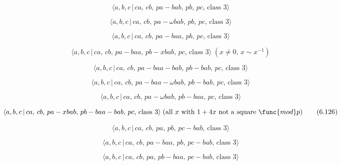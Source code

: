 \documentclass[10pt]{article}
\begin{document}
\begin{equation}
\langle a,b,c\,|\,ca,\,cb,\,pa-bab,\,pb,\,pc,\,\text{class }3\rangle 
\tag{6.119}
\end{equation}

\begin{equation}
\langle a,b,c\,|\,ca,\,cb,\,pa-\omega bab,\,pb,\,pc,\,\text{class }3\rangle 
\tag{6.120}
\end{equation}

\begin{equation}
\langle a,b,c\,|\,ca,\,cb,\,pa-baa,\,pb,\,pc,\,\text{class }3\rangle 
\tag{6.121}
\end{equation}

\begin{equation}
\langle a,b,c\,|\,ca,\,cb,\,pa-baa,\,pb-xbab,\,pc,\,\text{class }3\rangle
\;(x\neq 0,\,x\sim x^{-1})  \tag{6.122}
\end{equation}

\begin{equation}
\langle a,b,c\,|\,ca,\,cb,\,pa-baa-bab,\,pb-bab,\,pc,\,\text{class }3\rangle
\tag{6.123}
\end{equation}

\begin{equation}
\langle a,b,c\,|\,ca,\,cb,\,pa-baa-\omega bab,\,pb-bab,\,pc,\,\text{class }%
3\rangle  \tag{6.124}
\end{equation}

\begin{equation}
\langle a,b,c\,|\,ca,\,cb,\,pa-\omega bab,\,pb-baa,\,pc,\,\text{class }%
3\rangle  \tag{6.125}
\end{equation}

\begin{equation}
\langle a,b,c\,|\,ca,\,cb,\,pa-xbab,\,pb-baa-bab,\,pc,\,\text{class }%
3\rangle \;(\text{all }x\text{ with }1+4x\text{ not a square }\func{mod}p) 
\tag{6.126}
\end{equation}

\begin{equation}
\langle a,b,c\,|\,ca,\,cb,\,pa,\,pb,\,pc-bab,\,\text{class }3\rangle 
\tag{6.127}
\end{equation}

\begin{equation}
\langle a,b,c\,|\,ca,\,cb,\,pa-baa,\,pb,\,pc-bab,\,\text{class }3\rangle 
\tag{6.128}
\end{equation}

\begin{equation}
\langle a,b,c\,|\,ca,\,cb,\,pa,\,pb-baa,\,pc-bab,\,\text{class }3\rangle 
\tag{6.129}
\end{equation}
\end{document}
